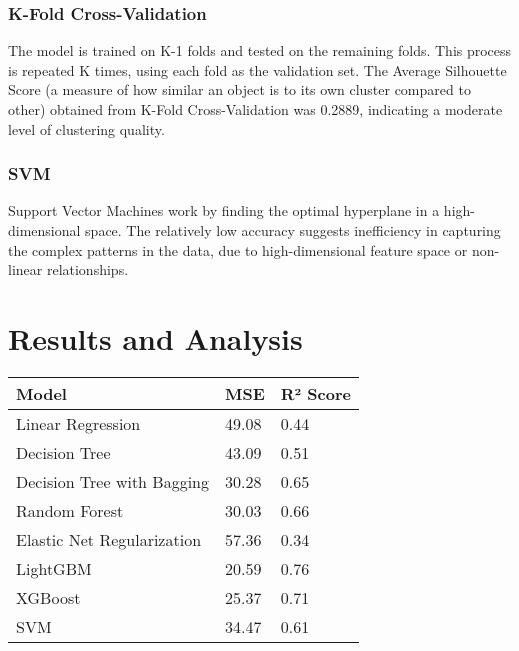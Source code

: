 \documentclass[10pt,twocolumn,letterpaper]{article}
\begin{document}
        \subsubsection{K-Fold Cross-Validation}
            The model is trained on K-1 folds and tested on the remaining folds. This process is repeated K times, using each fold as the validation set. The Average Silhouette Score (a measure of how similar an object is to its own cluster compared to other) obtained from K-Fold Cross-Validation was 0.2889, indicating a moderate level of clustering quality.

        \subsubsection{SVM}
            Support Vector Machines work by finding the optimal hyperplane in a high-dimensional space. The relatively low accuracy suggests inefficiency in capturing the complex patterns in the data, due to high-dimensional feature space or non-linear relationships.

\section{Results and Analysis}

    \begin{table}[h!]
        \centering
        \begin{tabular}{|l|l|l|}
            \hline
            \textbf{Model} & \textbf{MSE} & \textbf{R² Score} \\ \hline
            Linear Regression              & 49.08     & 0.44      \\ \hline
            Decision Tree                  & 43.09     & 0.51      \\ \hline
            Decision Tree with Bagging     & 30.28     & 0.65     \\ \hline
            Random Forest                  & 30.03     & 0.66      \\ \hline
            Elastic Net Regularization     & 57.36     & 0.34      \\ \hline
            LightGBM                      & 20.59    & 0.76     \\ \hline
            XGBoost                       & 25.37     & 0.71      \\ \hline
            SVM                       & 34.47     & 0.61      \\ \hline
        \end{tabular}
        \label{tab:model_metrics}
    \end{table}
\end{document}
